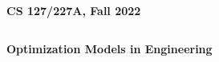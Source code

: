 \documentclass[12pt,letterpaper]{scrartcl}
\begin{document}
\thispagestyle{empty}
$ $
\vfill
\begin{center}
\centerline{\huge \textbf{CS 127/227A, Fall 2022}}
\[
\]
\centerline{\huge \textbf{Optimization Models in Engineering}}
\[
\]
\centerline{\huge {}}
\centerline{\huge {}} 
\end{center}
\vfill
$ $
\newpage
\tableofcontents
\newpage
\renewcommand\thesubsection{\thesection.\alph{subsection}}
\renewcommand\thesubsubsection{\thesection.\roman{subsubsection}}
 \vfill
 \vfill
 \vfill
 \vfill
%  
\end{document}
